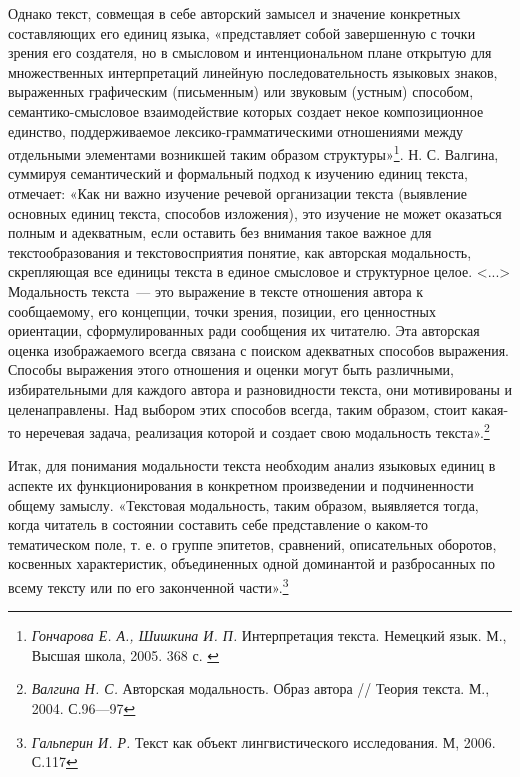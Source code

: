 \documentclass{kursa4}
\begin{document}
      Однако текст, совмещая в себе авторский замысел и значение конкретных составляющих его единиц языка, «представляет собой завершенную с точки зрения его создателя, но в смысловом и интенциональном плане открытую для множественных интерпретаций линейную последовательность языковых знаков, выраженных графическим (письменным) или звуковым (устным) способом, семантико-смысловое взаимодействие которых создает некое композиционное единство, поддерживаемое лексико-грамматическими отношениями между отдельными элементами возникшей таким образом структуры»\footnote{\textit{{Гончарова Е. А., Шишкина И. П. }}{Интерпретация текста. Немецкий язык. М., Высшая школа, 2005. 368 с. }}. Н. С. Валгина, суммируя семантический и формальный подход к изучению единиц текста, отмечает: «Как ни важно изучение речевой организации текста (выявление основных единиц текста, способов изложения), это изучение не может оказаться полным и адекватным, если оставить без внимания такое важное для текстообразования и текстовосприятия понятие, как авторская модальность, скрепляющая все единицы текста в единое смысловое и структурное целое. \textless{}...\textgreater{} Модальность текста~--- это выражение в тексте отношения автора к сообщаемому, его концепции, точки зрения, позиции, его ценностных ориентации, сформулированных ради сообщения их читателю. Эта авторская оценка изображаемого всегда связана с поиском адекватных способов выражения. Способы выражения этого отношения и оценки могут быть различными, избирательными для каждого автора и разновидности текста, они мотивированы и целенаправлены. Над выбором этих способов всегда, таким образом, стоит какая-то неречевая задача, реализация которой и создает свою модальность текста».\footnote{\textit{{Валгина Н. С. }}{Авторская модальность. Образ автора // Теория текста. М., 2004. С.96—97}} 

      Итак, для понимания модальности текста необходим анализ языковых единиц в аспекте их функционирования в конкретном произведении и подчиненности общему замыслу. «{Текстовая модальность, таким образом, выявляется тогда, когда читатель в состоянии составить себе представление о каком-то тематическом поле, т. е. о группе эпитетов, сравнений, описательных оборотов, косвенных характеристик, объединенных одной доминантой и разбросанных по всему тексту или по его законченной части».}\footnote{\textit{{Гальперин И. Р. }}{Текст как объект лингвистического исследования. М, 2006. С.117}}{ }
\end{document}
